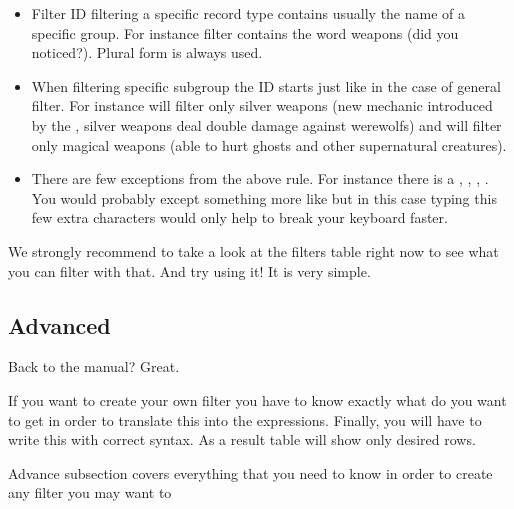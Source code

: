 \begin{itemize}
 \item Filter ID filtering a specific record type contains usually the name of a specific group. For instance  filter
 contains the word weapons (did you noticed?). Plural form is always used.
 \item When filtering specific subgroup the ID starts just like in the case of general filter. For instance  will
 filter only silver weapons (new mechanic introduced by the \BM{}, silver weapons deal double damage against werewolfs) and 
  will filter only magical weapons (able to hurt ghosts and other supernatural creatures).
 \item There are few exceptions from the above rule. For instance there is a , ,
       , .
 You would probably except something more like  but in this case typing this few extra characters would only
 help to break your keyboard faster.
\end{itemize}

We strongly recommend to take a look at the filters table right now to see what you can filter with that. And try using it! It is very simple.

\subsection{Advanced}
Back to the manual? Great.

If you want to create your own filter you have to know exactly what do you want to get in order to translate this into the expressions.
Finally, you will have to write this with correct syntax. As a result table will show only desired rows.

Advance subsection covers everything that you need to know in order to create any filter you may want to %
